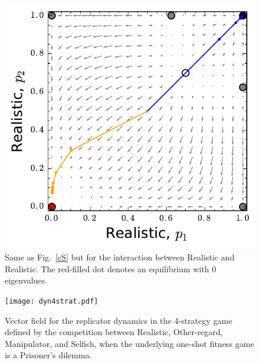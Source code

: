 \documentclass[11pt,reqno]{amsart}
\begin{document}
\begin{figure}
\begin{center}
\includegraphics[scale=0.6]{DSrr.pdf}
\caption{Same as Fig.~\ref{cS} but for the interaction between Realistic and Realistic. The red-filled dot denotes an equilibrium with 0 eigenvalues.}
\label{dspr}
\end{center}
\end{figure}



\begin{figure}
\begin{center}
\texttt{[image: dyn4strat.pdf]}
\caption{Vector field for the replicator dynamics in the 4-strategy game defined by the competition between Realistic, Other-regard, Manipulator, and Selfish, when the underlying one-shot fitness game is a Prisoner's dilemma.}
\label{dspr}
\end{center}
\end{figure}
\end{document}
